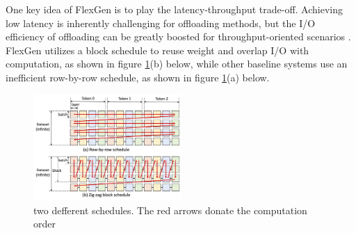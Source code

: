 \documentclass[conference]{IEEEtran}
\begin{document}
One key idea of FlexGen is to play the latency-throughput trade-off. Achieving low latency is inherently challenging for offloading methods, but the I/O efficiency of offloading can be greatly boosted for throughput-oriented scenarios . FlexGen utilizes a block schedule to reuse weight and overlap I/O with computation, as shown in figure \ref{device fig1}(b) below, while other baseline systems use an inefficient row-by-row schedule, as shown in figure \ref{device fig1}(a) below.
\begin{figure}[htbp]
    \centerline{\includegraphics[width=0.5\textwidth]{device fig2.jpg}}
    \caption{two defferent schedules. The red arrows donate the computation order}
    \label{device fig1}
\end{figure}
\end{document}
